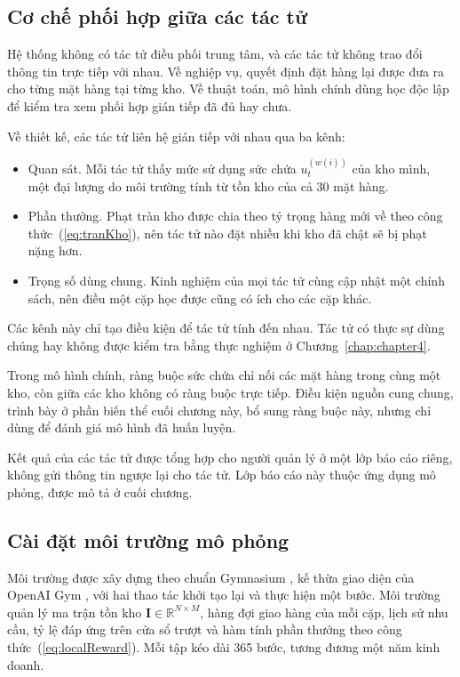\subsection{Cơ chế phối hợp giữa các tác tử}
\label{subsec:phoiHop}

Hệ thống không có tác tử điều phối trung tâm, và các tác tử không trao đổi thông tin trực tiếp với nhau. Về nghiệp vụ, quyết định đặt hàng lại được đưa ra cho từng mặt hàng tại từng kho. Về thuật toán, mô hình chính dùng học độc lập để kiểm tra xem phối hợp gián tiếp đã đủ hay chưa.

Về thiết kế, các tác tử liên hệ gián tiếp với nhau qua ba kênh:
\begin{itemize}
    \item Quan sát. Mỗi tác tử thấy mức sử dụng sức chứa $u_t^{(w(i))}$ của kho mình, một đại lượng do môi trường tính từ tồn kho của cả 30 mặt hàng.
    \item Phần thưởng. Phạt tràn kho được chia theo tỷ trọng hàng mới về theo công thức~(\ref{eq:tranKho}), nên tác tử nào đặt nhiều khi kho đã chật sẽ bị phạt nặng hơn.
    \item Trọng số dùng chung. Kinh nghiệm của mọi tác tử cùng cập nhật một chính sách, nên điều một cặp học được cũng có ích cho các cặp khác.
\end{itemize}

Các kênh này chỉ tạo điều kiện để tác tử tính đến nhau. Tác tử có thực sự dùng chúng hay không được kiểm tra bằng thực nghiệm ở Chương~\ref{chap:chapter4}.

Trong mô hình chính, ràng buộc sức chứa chỉ nối các mặt hàng trong cùng một kho, còn giữa các kho không có ràng buộc trực tiếp. Điều kiện nguồn cung chung, trình bày ở phần biến thể cuối chương này, bổ sung ràng buộc này, nhưng chỉ dùng để đánh giá mô hình đã huấn luyện.

Kết quả của các tác tử được tổng hợp cho người quản lý ở một lớp báo cáo riêng, không gửi thông tin ngược lại cho tác tử. Lớp báo cáo này thuộc ứng dụng mô phỏng, được mô tả ở cuối chương.

\subsection{Cài đặt môi trường mô phỏng}
\label{sec:moiTruong}

Môi trường được xây dựng theo chuẩn Gymnasium \parencite{towers2024gymnasium}, kế thừa giao diện của OpenAI Gym \parencite{brockman2016gym}, với hai thao tác khởi tạo lại và thực hiện một bước. Môi trường quản lý ma trận tồn kho $\mathbf{I} \in \mathbb{R}^{N \times M}$, hàng đợi giao hàng của mỗi cặp, lịch sử nhu cầu, tỷ lệ đáp ứng trên cửa sổ trượt và hàm tính phần thưởng theo công thức~(\ref{eq:localReward}). Mỗi tập kéo dài 365 bước, tương đương một năm kinh doanh.

